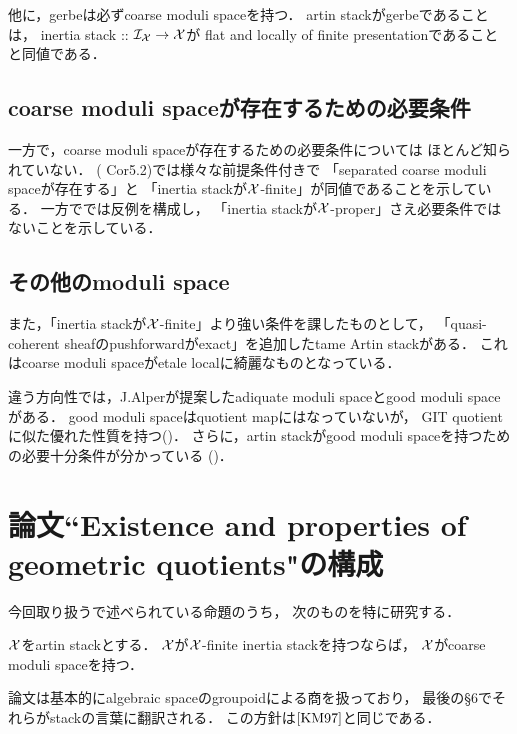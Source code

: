 \documentclass[a4paper, dvipdfmx]{jsarticle}
\begin{document}
    他に，gerbeは必ずcoarse moduli spaceを持つ．
    artin stackがgerbeであることは，
    inertia stack :: $\mathcal{I}_{\mathcal{X}} \to \mathcal{X}$が
    flat and locally of finite presentationであることと同値である．

    \subsection{coarse moduli spaceが存在するための必要条件}
    一方で，coarse moduli spaceが存在するための必要条件については
    ほとんど知られていない．
    (\cite{Con05} Cor5.2)では様々な前提条件付きで
    「separated coarse moduli spaceが存在する」と
    「inertia stackが$\mathcal{X}$-finite」が同値であることを示している．
    一方で\cite{Rydh13}では反例を構成し，
    「inertia stackが$\mathcal{X}$-proper」さえ必要条件ではないことを示している．

    \subsection{その他のmoduli space}
    また，「inertia stackが$\mathcal{X}$-finite」より強い条件を課したものとして，
    「quasi-coherent sheafのpushforwardがexact」を追加したtame Artin stackがある．
    これはcoarse moduli spaceがetale localに綺麗なものとなっている．

    違う方向性では，J.Alperが提案したadiquate moduli spaceとgood moduli spaceがある．
    good moduli spaceはquotient mapにはなっていないが，
    GIT quotientに似た優れた性質を持つ(\cite{Alp13})．
    さらに，artin stackがgood moduli spaceを持つための必要十分条件が分かっている
    (\cite{AHLH18})．

\section{論文``Existence and properties of geometric quotients"の構成}
    今回取り扱う\cite{Rydh13}で述べられている命題のうち，
    次のものを特に研究する．
    \begin{Thm}
        $\mathcal{X}$をartin stackとする．
        $\mathcal{X}$が$\mathcal{X}$-finite inertia stackを持つならば，
        $\mathcal{X}$がcoarse moduli spaceを持つ．
    \end{Thm}
    論文は基本的にalgebraic spaceのgroupoidによる商を扱っており，
    最後の\S 6でそれらがstackの言葉に翻訳される．
    この方針は$\cite{KM97}$と同じである．
\end{document}
